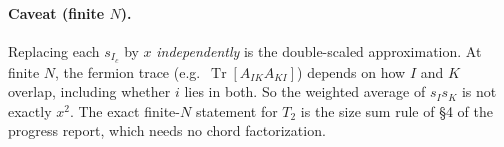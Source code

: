 \documentclass[11pt]{article}
\newcommand{\Tr}{\operatorname{Tr}}
\begin{document}
\paragraph{Caveat (finite $N$).} Replacing each $s_{I_c}$ by $x$ \emph{independently} is the double-scaled
approximation. At finite $N$, the fermion trace (e.g.\ $\Tr[A_{IK}A_{KI}]$) depends on how $I$ and $K$ overlap,
including whether $i$ lies in both. So the weighted average of $s_Is_K$ is not exactly $x^2$. The exact finite-$N$
statement for $T_2$ is the size sum rule of \S4 of the progress report, which needs no chord factorization.
\end{document}
